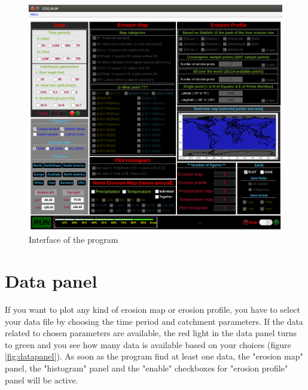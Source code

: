 \documentclass[11pt,a4paper,titlepage]{report}
\begin{document}
\begin{figure}[H]
    \centering
    \includegraphics[width=1\textwidth]{mainscreen.png}
    \caption[Interface of the program]{Interface of the program}
    \label{fig:interface}    
\end{figure}

\section{Data panel}
If you want to plot any kind of erosion map or erosion profile, you have to select your data file by choosing the time period and catchment parameters. If the data related to chosen parameters are available, the red light in the data panel turns to green and you see how many data is available based on your choices (figure \ref{fig:datapanel}). As soon as the program find at least one data, the "erosion map" panel, the "histogram" panel and the "enable" checkboxes for "erosion profile" panel will be active.
\end{document}
